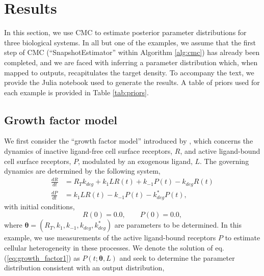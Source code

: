 \section{Results}\label{sec:results}
In this section, we use CMC to estimate posterior parameter distributions for three biological systems. In all but one of the examples, we assume that the first step of CMC (``SnapshotEstimator'' within Algorithm \ref{alg:cmc}) has already been completed, and we are faced with inferring a parameter distribution which, when mapped to outputs, recapitulates the target density. To accompany the text, we provide the Julia notebook used to generate the results. A table of priors used for each example is provided in Table \ref{tab:priors}.


\subsection{Growth factor model}
We first consider the ``growth factor model'' introduced by \cite{dixit2018maximum}, which concerns the dynamics of inactive ligand-free cell surface receptors, $R$, and active ligand-bound cell surface receptors, $P$, modulated by an exogenous ligand, $L$. The governing dynamics are determined by the following system,
%
\begin{align}\label{eq:growth_factor}
\frac{dR}{dt} &= R_T k_{deg} + k_1 L R(t) + k_{-1} P(t) - k_{deg} R(t)\\
\label{eq:growth_factor1}
\frac{dP}{dt} &= k_1 L R(t) - k_{-1} P(t) - k^*_{deg} P(t),
\end{align}
with initial conditions,
\begin{equation*}
R(0) = 0.0, \qquad P(0) = 0.0,
\end{equation*}
%
where $\boldsymbol{\theta}=(R_T, k_1, k_{-1}, k_{deg}, k^*_{deg})$ are parameters to be determined. In this example, we use measurements of the active ligand-bound receptors $P$ to estimate cellular heterogeneity in these processes. We denote the solution of eq. (\ref{eq:growth_factor1}) as $P(t; \boldsymbol{\theta}, L)$ and seek to determine the parameter distribution consistent with an output distribution,
%
